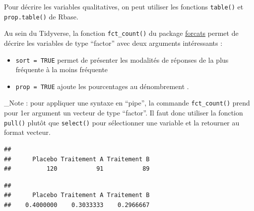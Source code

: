 \documentclass[
]{book}
\newenvironment{Shaded}{\begin{snugshade}}{\end{snugshade}}
\newcommand{\DocumentationTok}[1]{\textcolor[rgb]{0.56,0.35,0.01}{\textbf{\textit{#1}}}}
\newcommand{\FunctionTok}[1]{\textcolor[rgb]{0.13,0.29,0.53}{\textbf{#1}}}
\newcommand{\NormalTok}[1]{#1}
\newcommand{\SpecialCharTok}[1]{\textcolor[rgb]{0.81,0.36,0.00}{\textbf{#1}}}
\providecommand{\tightlist}{%
  \setlength{\itemsep}{0pt}\setlength{\parskip}{0pt}}
\begin{document}
Pour décrire les variables qualitatives, on peut utiliser les fonctions \texttt{table()} et \texttt{prop.table()} de Rbase.

Au sein du Tidyverse, la fonction \texttt{fct\_count()} du package \href{https://raw.githubusercontent.com/rstudio/cheatsheets/main/factors.pdf}{forcats} permet de décrire les variables de type ``factor'' avec deux arguments intéressants :

\begin{itemize}
\tightlist
\item
  \texttt{sort\ =\ TRUE} permet de présenter les modalités de réponses de la plus fréquente à la moins fréquente
\item
  \texttt{prop\ =\ TRUE} ajoute les pourcentages au dénombrement .
\end{itemize}

\_Note : pour appliquer une syntaxe en ``pipe'', la commande \texttt{fct\_count()} prend pour 1er argument un vecteur de type ``factor''. Il faut donc utiliser la fonction \texttt{pull()} plutôt que \texttt{select()} pour sélectionner une variable et la retourner au format vecteur.

\begin{Shaded}
\end{Shaded}

\begin{verbatim}
## 
##      Placebo Traitement A Traitement B 
##          120           91           89
\end{verbatim}

\begin{Shaded}
\end{Shaded}

\begin{verbatim}
## 
##      Placebo Traitement A Traitement B 
##    0.4000000    0.3033333    0.2966667
\end{verbatim}

\begin{Shaded}
\end{Shaded}
\end{document}
